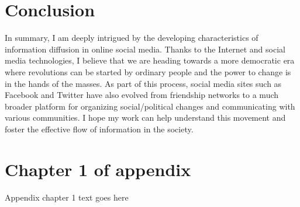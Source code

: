 \documentclass[phd,tocprelim]{cornell}
\begin{document}
\chapter{Conclusion}
    In summary, I am deeply intrigued by the developing characteristics of information diffusion in online social media. Thanks to the Internet and social media technologies, I believe that we are heading towards a more democratic era where revolutions can be started by ordinary people and the power to change is in the hands of the masses. As part of this process, social media sites such as Facebook and Twitter have also evolved from friendship networks to a much broader platform for organizing social/political changes and communicating with various communities. I hope my work can help understand this movement and foster the effective flow of information in the society.


\appendix
\chapter{Chapter 1 of appendix}
Appendix chapter 1 text goes here


\end{document}
